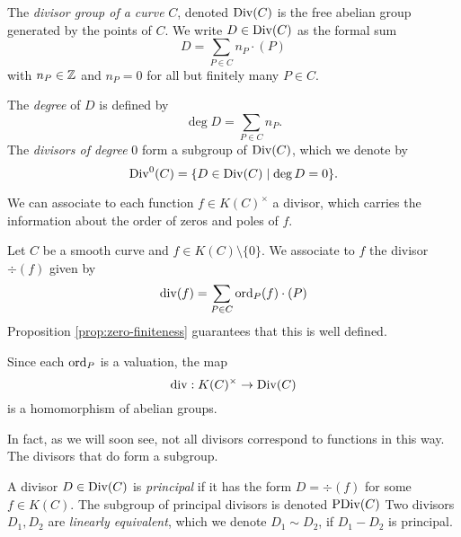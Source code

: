 \begin{definition}
	The \emph{divisor group of a curve} $C$, denoted $\operatorname{Div}(C)$ is the free
	abelian group generated by the points of $C$. We write $D \in \operatorname{Div}(C)$ as
	the formal sum
	\begin{equation*}
		D = \sum_{P \in C} n_P\cdot(P)
	\end{equation*}
	with $n_P \in \mathbb{Z}$ and $n_P = 0$ for all but finitely many $P \in C$.

	The \emph{degree} of $D$ is defined by
	\begin{equation*}
		\deg D = \sum_{P \in C} n_P.
	\end{equation*}
	The \emph{divisors of degree} 0 form a subgroup of $\operatorname{Div}(C)$, which we denote
	by
	\begin{equation*}
		\operatorname{Div}^0(C) = \{D \in \operatorname{Div}(C) \mid \deg D = 0\}.
	\end{equation*}
\end{definition}

We can associate to each function $f \in K(C)^\times$ a divisor, which carries
the information about the order of zeros and poles of $f$.

\begin{definition}
	Let $C$ be a smooth curve and $f \in K(C)\setminus\{0\}$. We
	associate to $f$ the divisor $\div(f)$ given by
	\begin{equation*}
		\operatorname{div}(f) = \sum_{P \in C}\operatorname{ord}_P(f)\cdot(P)
	\end{equation*}
	Proposition \ref{prop:zero-finiteness} guarantees that this is well
	defined.
\end{definition}

\begin{remark}
	Since each $\operatorname{ord}_P$ is a valuation, the map
	\begin{equation*}
		\operatorname{div}: K(C)^\times \to \operatorname{Div}(C)
	\end{equation*}
	is a homomorphism of abelian groups.
\end{remark}

In fact, as we will soon see, not all divisors correspond to functions
in this way. The divisors that do form a subgroup.

\begin{definition}
	A divisor $D \in \operatorname{Div}(C)$ is \emph{principal} if it has the form
	$D = \div(f)$ for some $f \in K(C)$. The subgroup of principal divisors
	is denoted $\operatorname{PDiv}(C)$
	Two divisors $D_1, D_2$ are \emph{linearly equivalent}, which we denote
	$D_1 \sim D_2$, if $D_1 - D_2$ is principal.
\end{definition}

